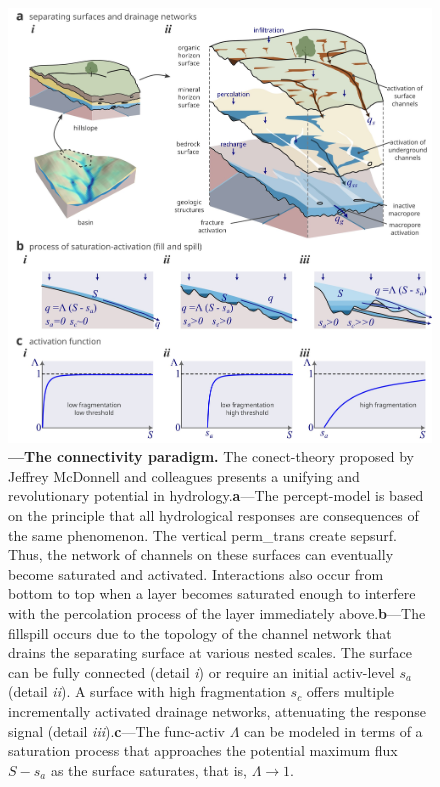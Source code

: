 \documentclass[./main_en.tex]{subfiles}
\begin{document}
\begin{figure}[t!] 
\centering				
\includegraphics[width=0.98\linewidth]{figs/fig_connect_en.jpg}		
\caption[The connectivity paradigm]
{\textbf{---\;The connectivity paradigm.} The \gls{conect-theory} proposed by Jeffrey McDonnell and colleagues presents a unifying and revolutionary potential in \gls{hydrology}.\;\textbf{a}\;---\;The \gls{percept-model} is based on the principle that all hydrological responses are consequences of the same phenomenon. The vertical \gls{perm_trans} create \gls{sepsurf}. Thus, the network of channels on these surfaces can eventually become saturated and activated. Interactions also occur from bottom to top when a layer becomes saturated enough to interfere with the percolation process of the layer immediately above.\;\textbf{b}\;---\;The \gls{fillspill} occurs due to the topology of the channel network that drains the separating surface at various nested scales. The surface can be fully connected (detail \textrm{\textit{i}}) or require an initial \gls{activ-level} $s_a$ (detail \textrm{\textit{ii}}). A surface with high fragmentation $s_c$ offers multiple incrementally activated drainage networks, attenuating the response signal (detail \textrm{\textit{iii}}).\;\textbf{c}\;---\;The \gls{func-activ} $\Lambda$ can be modeled in terms of a saturation process that approaches the potential maximum flux $S - s_a$ as the surface saturates, that is, $\Lambda \rightarrow 1$.    
}
\label{fig:connnect} 		
\end{figure}
\end{document}
